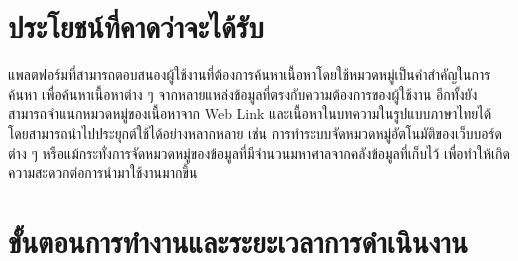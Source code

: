 \documentclass[12pt,oneside,openright,a4paper]{cpe-thai-project}
\begin{document}
  \hspace{1cm}

\section{ประโยชน์ที่คาดว่าจะได้รับ}

  \hspace{1cm}แพลตฟอร์มที่สามารถตอบสนองผู้ใช้งานที่ต้องการค้นหาเนื้อหาโดยใช้หมวดหมู่เป็นคำสำคัญในการค้นหา เพื่อค้นหาเนื้อหาต่าง ๆ จากหลายแหล่งข้อมูลที่ตรงกับความต้องการของผู้ใช้งาน 
  อีกทั้งยังสามารถจำแนกหมวดหมู่ของเนื้อหาจาก Web Link และเนื้อหาในบทความในรูปแบบภาษาไทยได้ โดยสามารถนำไปประยุกต์ใช้ได้อย่างหลากหลาย เช่น 
  การทำระบบจัดหมวดหมู่อัตโนมัติของเว็บบอร์ดต่าง ๆ หรือแม้กระทั่งการจัดหมวดหมู่ของข้อมูลที่มีจำนวนมหาศาลจากคลังข้อมูลที่เก็บไว้ เพื่อทำให้เกิดความสะดวกต่อการนำมาใช้งานมากขึ้น

\section{ขั้นตอนการทํางานและระยะเวลาการดําเนินงาน} 
\end{document}
